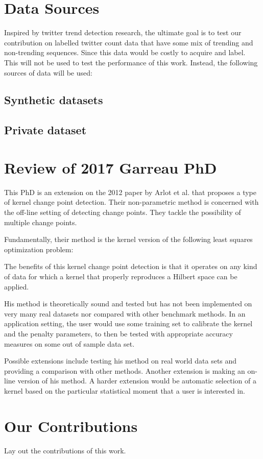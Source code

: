 \section{Data Sources}

Inspired by twitter trend detection research, the ultimate goal is to test our contribution on labelled twitter count data that have some mix of trending and non-trending sequences. Since this data would be costly to acquire and label. This will not be used to test the performance of this work. Instead, the following sources of data will be used:
 \subsection{Synthetic datasets}
\subsection{Private dataset}
  
\section{Review of 2017 Garreau PhD }
This PhD is an extension on the 2012 paper by Arlot et al. \cite{arlot2012kernel} that proposes a type of kernel change point detection. Their non-parametric method is concerned with the off-line setting of detecting change points. They tackle the possibility of multiple change points.

Fundamentally, their method is the kernel version of the following least squares optimization problem:


The benefits of this kernel change point detection is that it operates on any kind of data for which a kernel that properly reproduces a Hilbert space can be applied. 

His method is theoretically sound and tested but has not been implemented on very many real datasets nor compared with other benchmark methods. In an application setting, the user would use some training set to calibrate the kernel and the penalty parameters, to then be tested with appropriate accuracy measures on some out of sample data set.

Possible extensions include testing his method on real world data sets and providing a comparison with other methods. Another extension is making an on-line version of his method. A harder extension would be automatic selection of a kernel based on the particular statistical moment that a user is interested in.

\section{Our Contributions}
Lay out the contributions of this work.